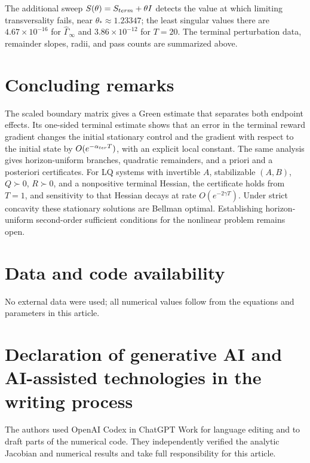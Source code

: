 \documentclass[twocolumn,nameyear,amsthm]{autart}
\numberwithin{equation}{section}
\begin{document}
The additional sweep $S(\theta)=S_{\rm term}+\theta I$ detects the value at
which limiting transversality fails, near $\theta_*\approx1.23347$; the least singular values there
are $4.67\times10^{-16}$ for $\widehat\Gamma_\infty$ and
$3.86\times10^{-12}$ for $T=20$.  The terminal perturbation data, remainder slopes,
radii, and pass counts are summarized above.

\section{Concluding remarks}\label{sec:conclusion}
The scaled boundary matrix gives a Green estimate that separates both endpoint
effects.  Its one-sided terminal estimate shows that an error in the terminal
reward gradient changes the initial stationary control and the gradient with
respect to the initial state by $O(e^{-\alpha_{\rm ter}T})$, with an explicit
local constant.  The same analysis gives horizon-uniform branches, quadratic
remainders, and a priori and a posteriori certificates.  For LQ systems with
invertible $A$, stabilizable $(A,B)$, $Q\succ0$, $R\succ0$, and a nonpositive
terminal Hessian, the certificate holds from $T=1$, and sensitivity to that
Hessian decays at rate $O(e^{-2\gamma T})$.  Under strict concavity these
stationary solutions are Bellman optimal.  Establishing horizon-uniform
second-order sufficient conditions for the nonlinear problem remains open.

\section*{Data and code availability}
No external data were used; all numerical values follow from the equations and
parameters in this article.

\section*{Declaration of generative AI and AI-assisted technologies in the writing process}
The authors used OpenAI Codex in ChatGPT Work for language editing and to draft
parts of the numerical code.  They independently verified the analytic
Jacobian and numerical results and take full responsibility for this article.
\end{document}
